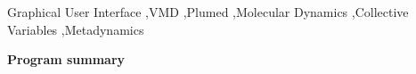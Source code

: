 \documentclass[preprint,review,11pt]{elsarticle}
\newcommand{\mykeywords}{Graphical User Interface \sep VMD \sep Plumed \sep Molecular Dynamics \sep Collective Variables \sep Metadynamics}
\begin{document}
\begin{frontmatter}



\begin{keyword}
\mykeywords
\end{keyword}

\end{frontmatter}



{\bf Program summary}
\end{document}
